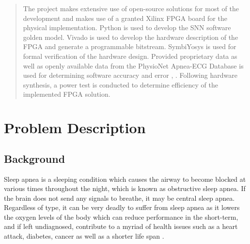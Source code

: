 \documentclass[12pt,titlepage]{article}
\begin{document}
\begin{abstract}
The project makes extensive use of open-source solutions for most of the development and makes use of a granted Xilinx FPGA board for the physical
implementation. Python is used to develop the SNN software golden model. Vivado is used to develop the hardware description of the FPGA and
generate a programmable bitstream. SymbiYosys is used for formal verification of the hardware design. Provided proprietary data as well as openly
available data from the PhysioNet Apnea-ECG Database is used for determining software accuracy and error \cite{penzel}, \cite{physiobank}. Following
hardware synthesis, a power test is conducted to determine efficiency of the implemented FPGA solution.
\end{abstract}

\tableofcontents

\listoffigures

\listoftables

\newpage
\section{Problem Description}
\subsection{Background}
Sleep apnea is a sleeping condition which causes the airway to become blocked at various times throughout the night, which is known as
obstructive sleep apnea. If the brain does not send any signals to breathe, it may be central sleep apnea. Regardless of type, it can
be very deadly to suffer from sleep apnea as it lowers the oxygen levels of the body which can reduce performance in the short-term,
and if left undiagnosed, contribute to a myriad of health issues such as a heart attack, diabetes, cancer as well as a shorter life
span \cite{hopkins}.
\end{document}
